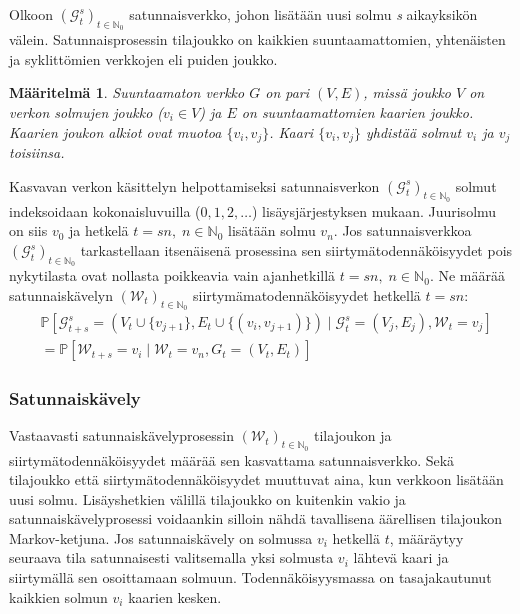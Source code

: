\documentclass[finnish, 12pt, a4paper, sci, utf8, pdfa]{aaltothesis}
\newcommand{\N}{\mathbb{N}}
\newcommand{\Grandom}{\mathcal{G}}
\newcommand{\Wrandom}{\mathcal{W}}
\newcommand*{\prob}{\mathbb{P}}
\newtheorem{definition}{Määritelmä}
\begin{document}
Olkoon \( (\Grandom_{t}^{s})_{t \in \N_{0}} \) satunnaisverkko, johon lisätään uusi solmu \textit{s} aikayksikön välein. Satunnaisprosessin tilajoukko on kaikkien suuntaamattomien, yhtenäisten ja syklittömien verkkojen eli puiden joukko.
\begin{definition}
   \label{definition:verkko}
Suuntaamaton verkko $ G $ on pari $ (V, E) $, missä joukko $ V $ on verkon solmujen joukko (\( v_{i} \in V \)) ja $ E $ on suuntaamattomien kaarien joukko. Kaarien joukon alkiot ovat muotoa \( \{ v_{i}, v_{j} \} \). Kaari \( \{ v_{i}, v_{j} \} \) yhdistää solmut \( v_{i} \) ja \( v_{j} \) toisiinsa. 
\end{definition}
Kasvavan verkon käsittelyn helpottamiseksi satunnaisverkon \( (\Grandom_{t}^{s})_{t \in \N_{0}} \) solmut indeksoidaan kokonaisluvuilla (\( 0, 1, 2, \ldots \)) lisäysjärjestyksen mukaan. Juurisolmu on siis \( v_{0} \) ja hetkelä \( t = sn, \; n \in \N_{0} \) lisätään solmu \( v_{n} \). Jos satunnaisverkkoa \( (\Grandom_{t}^{s})_{t \in \N_{0}} \) tarkastellaan itsenäisenä prosessina sen siirtymätodennäköisyydet pois nykytilasta ovat nollasta poikkeavia vain ajanhetkillä \( t = sn, \; n \in \N_{0} \). Ne määrää satunnaiskävelyn \( (\Wrandom_{t})_{t \in \N_{0}} \) siirtymämatodennäköisyydet hetkellä \( t = sn \):
\begin{equation}
\begin{split}
   & \prob \left[ \Grandom_{t+s}^{s} = (V_{t} \cup \{ v_{j + 1} \}, E_{t} \cup \{ (v_{i}, v_{j + 1}) \}) \mid \Grandom_{t}^{s} = (V_{j}, E_{j}), \Wrandom_{t} = v_{j} \right] \\
   &= \prob \left[ \Wrandom_{t+s} = v_{i} \mid \Wrandom_{t} = v_{n}, G_{t} = (V_{t}, E_{t}) \right]
\end{split}
\end{equation}

\subsubsection{Satunnaiskävely}

Vastaavasti satunnaiskävelyprosessin \( (\Wrandom_{t})_{t \in \N_{0}} \) tilajoukon ja siirtymätodennäköisyydet määrää sen kasvattama satunnaisverkko. Sekä tilajoukko että siirtymätodennäköisyydet muuttuvat aina, kun verkkoon lisätään uusi solmu. Lisäyshetkien välillä tilajoukko on kuitenkin vakio ja satunnaiskävelyprosessi voidaankin silloin nähdä tavallisena äärellisen tilajoukon Markov-ketjuna. Jos satunnaiskävely on solmussa \( v_{i} \) hetkellä \( t \), määräytyy seuraava tila satunnaisesti valitsemalla yksi solmusta \( v_{i} \) lähtevä kaari ja siirtymällä sen osoittamaan solmuun. Todennäköisyysmassa on tasajakautunut kaikkien solmun \( v_{i} \) kaarien kesken. 
\end{document}
